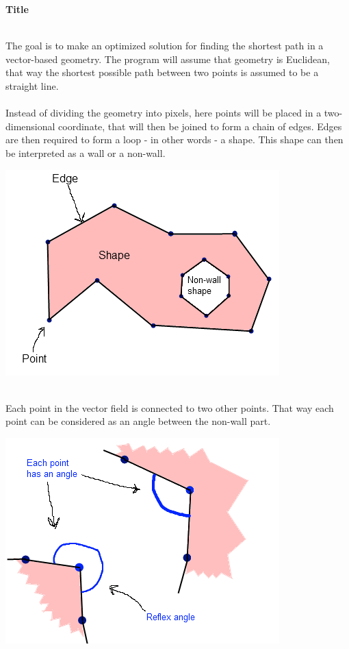 \documentclass[a4paper,12pt]{article}
\begin{document}
\centerline{\huge \textbf{Title}} \hspace*{\fill}
\\
The goal is to make an optimized solution for finding the shortest path in a vector-based geometry. The program will assume that geometry is Euclidean, that way the shortest possible path between two points is assumed to be a straight line.
\\
\\
Instead of dividing the geometry into pixels, here points will be placed in a two-dimensional
coordinate, that will then be joined to form a chain of edges. Edges are then required to form
a loop - in other words - a shape. This shape can then be interpreted as a wall or a non-wall.
\\
\centerline{\includegraphics[scale=0.5]{pointedgeshape.png}} \hspace*{\fill}
\\
Each point in the vector field is connected to two other points. That way each point can be considered as an angle between the non-wall part.
\\
\centerline{\includegraphics[scale=0.5]{pointsandangles.png}} \hspace*{\fill}
\end{document}
